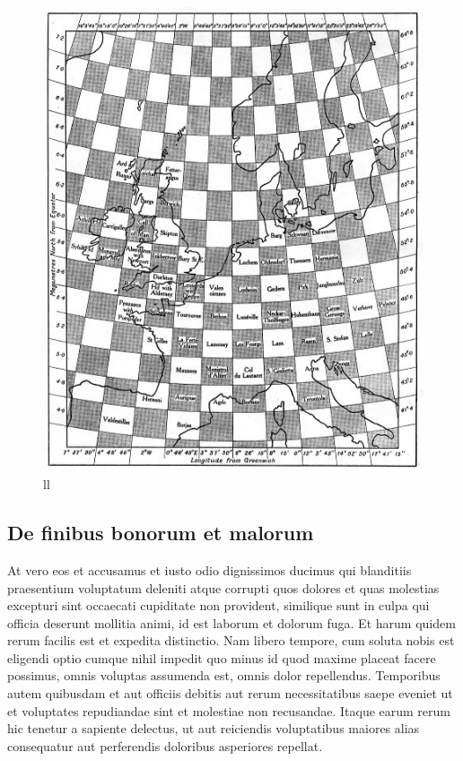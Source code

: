 \begin{figure}
	\centering
	\includegraphics{eingeteilte_Karte.jpg}
	\caption{ll}
	\label{bild:karteEuropa}
\end{figure}


\subsection{De finibus bonorum et malorum
\label{geostrophisch:subsection:bonorum}}
At vero eos et accusamus et iusto odio dignissimos ducimus qui
blanditiis praesentium voluptatum deleniti atque corrupti quos
dolores et quas molestias excepturi sint occaecati cupiditate non
provident, similique sunt in culpa qui officia deserunt mollitia
animi, id est laborum et dolorum fuga. Et harum quidem rerum facilis
est et expedita distinctio. Nam libero tempore, cum soluta nobis
est eligendi optio cumque nihil impedit quo minus id quod maxime
placeat facere possimus, omnis voluptas assumenda est, omnis dolor
repellendus. Temporibus autem quibusdam et aut officiis debitis aut
rerum necessitatibus saepe eveniet ut et voluptates repudiandae
sint et molestiae non recusandae. Itaque earum rerum hic tenetur a
sapiente delectus, ut aut reiciendis voluptatibus maiores alias
consequatur aut perferendis doloribus asperiores repellat.


